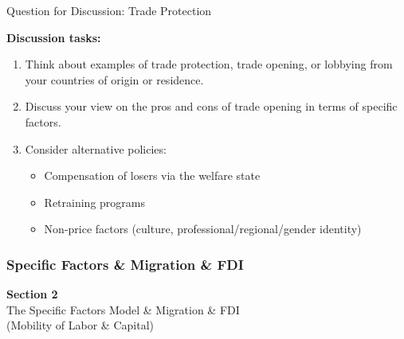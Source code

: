 \documentclass{beamer}
\begin{document}
\begin{frame}{Question for Discussion: Trade Protection}

\textbf{Discussion tasks:}

\vspace{0.3cm}

\begin{enumerate}
    \item Think about examples of trade protection, trade opening, or lobbying from your countries of origin or residence.
    
    \vspace{0.3cm}
    
    \item Discuss your view on the pros and cons of trade opening in terms of specific factors.
    
    \vspace{0.3cm}
    
    \item Consider alternative policies:
    \begin{itemize}
        \item Compensation of losers via the welfare state
        \item Retraining programs
        \item Non-price factors (culture, professional/regional/gender identity)
    \end{itemize}
\end{enumerate}

\end{frame}

\subsubsection{Specific Factors \& Migration \& FDI}


\begin{frame}

\vspace{2cm}

\centering
{\LARGE \textbf{Section 2}} \\[0.5cm]
{\Large The Specific Factors Model \& Migration \& FDI} \\[0.3cm]
{\large (Mobility of Labor \& Capital)}

\vfill

\end{frame}
\end{document}
